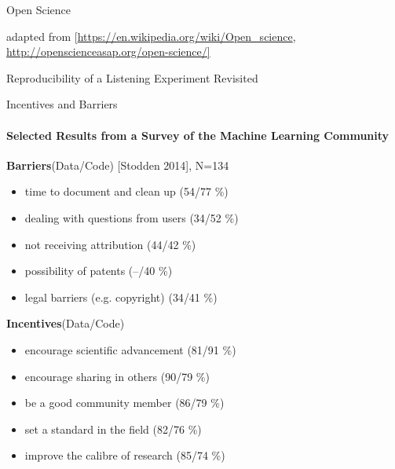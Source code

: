 \documentclass{intbeamer}
\newcommand\data[1]{{\color{structure.fg}#1}}
\begin{document}
\begin{frame}{Open Science}



\vspace{2mm}
{\tiny adapted from [\url{https://en.wikipedia.org/wiki/Open_science}, \url{http://openscienceasap.org/open-science/]}}

\end{frame}


\begin{frame}{Reproducibility of a Listening Experiment Revisited}


\end{frame}


\begin{frame}{Incentives and Barriers}
\framesubtitle{Selected Results from a Survey of the Machine Learning Community}

\textbf{Barriers}(\data{Data}/Code) {\tiny [Stodden 2014], N=134}
\begin{itemize}
\item time to document and clean up (\data{54}/77 \%)
\item dealing with questions from users (\data{34}/52 \%)
\item not receiving attribution (\data{44}/42 \%)
\item possibility of patents (\data{--}/40 \%)
\item legal barriers (e.g. copyright) (\data{34}/41 \%)
\end{itemize}

\vspace{3mm}

\textbf{Incentives}(\data{Data}/Code)
\begin{itemize}
\item encourage scientific advancement (\data{81}/91 \%)
\item encourage sharing in others (\data{90}/79 \%)
\item be a good community member (\data{86}/79 \%)
\item set a standard in the field (\data{82}/76 \%)
\item improve the calibre of research (\data{85}/74 \%)
\end{itemize}

\end{frame}
\end{document}
